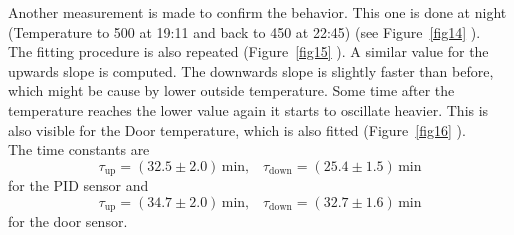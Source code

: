\documentclass[12pt]{scrartcl}
\begin{document}
      Another measurement is made to confirm the behavior. This one is done at
      night (Temperature to 500 at 19:11 and back to 450 at 22:45)
      (see Figure~\ref{fig14} ). \\ The fitting procedure is also repeated
      (Figure~\ref{fig15} ). A similar value for the upwards slope is computed. The
      downwards slope is slightly faster than before, which might be cause by
      lower outside temperature. Some time after the
      temperature reaches the lower value again it starts to oscillate heavier.
      This is also visible for the Door temperature, which is also fitted
      (Figure~\ref{fig16} ). \\
      The time constants are
      $$\tau_{\text{up}} = (32.5 \pm 2.0)\,\text{min}, \;\;\; \tau_{\text{down}} =
      (25.4 \pm 1.5) \,\text{min}$$
      for the PID sensor and
      $$\tau_{\text{up}} = (34.7 \pm 2.0) \,\text{min}, \;\;\;
      \tau_{\text{down}} = (32.7 \pm 1.6) \,\text{min}$$
      for the door sensor.
\end{document}
